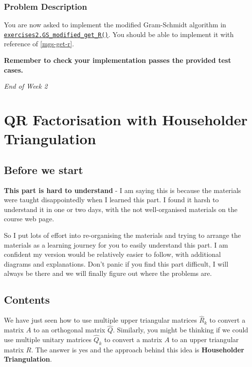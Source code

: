  \subsubsection*{Problem Description}%
  You are now asked to implement the modified Gram-Schmidt algorithm in \href{https://comp-lin-alg.github.io/cla_utils.html#cla_utils.exercises2.GS_modified_get_R}{\texttt{exercises2.GS\_modified\_get\_R()}}. You should be able to implement it with reference of \autoref{mgs-get-r}. \medskip
  
\noindent \textbf{Remember to check your implementation passes the provided test cases.}


 \bigskip

 \begin{center}
   \textit{\large End of Week 2}
 \end{center}
\newpage
\section{QR Factorisation with Householder Triangulation}
\subsection*{Before we start}
\textbf{This part is hard to understand} - I am saying this is because the materials were taught disappointedly when I learned this part. I found it harsh to understand it in one or two days, with the not well-organised materials on the course web page. \medskip

\noindent So I put lots of effort into re-organising the materials and trying to arrange the materials as a learning journey for you to easily understand this part. I am confident my version would be relatively easier to follow, with additional diagrams and explanations. Don't panic if you find this part difficult, I will always be there and we will finally figure out where the problems are.

\subsection*{Contents}
We have just seen how to use multiple upper triangular matrices $\hat{R}_{k}$ to convert a matrix $A$ to an orthogonal matrix $\hat{Q}$. Similarly, you might be thinking if we could use multiple unitary matrices $\hat{Q}_{k}$ to convert a matrix $A$ to an upper triangular matrix $R$. The answer is yes and the approach behind this idea is \textbf{Householder Triangulation}. \medskip

